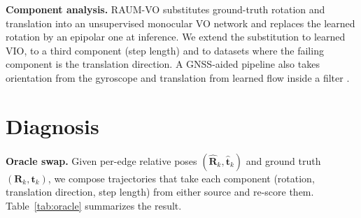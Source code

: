 \documentclass[letterpaper,journal]{IEEEtran}
\begin{document}
\textbf{Component analysis.} RAUM-VO \cite{Cimarelli2022} substitutes ground-truth rotation and translation into an unsupervised monocular VO network and replaces the learned rotation by an epipolar one at inference. We extend the substitution to learned VIO, to a third component (step length) and to datasets where the failing component is the translation direction. A GNSS-aided pipeline also takes orientation from the gyroscope and translation from learned flow inside a filter \cite{Kang2025}.

\section{Diagnosis}
\label{sec:diag}

\textbf{Oracle swap.} Given per-edge relative poses $(\hat{\mathbf{R}}_k,\hat{\mathbf{t}}_k)$ and ground truth $(\mathbf{R}_k,\mathbf{t}_k)$, we compose trajectories that take each component (rotation, translation direction, step length) from either source and re-score them. Table~\ref{tab:oracle} summarizes the result.

\begin{table}[t]
\caption{Oracle swaps. KITTI: our VIFT reproduction (released code, with-08 split, checkpoint selected on the test drives as in VIFT's code), $t_\mathrm{rel}$\,\% / $r_\mathrm{rel}$\,$^\circ$/100\,m, mean of 05/07/10. EuRoC: learned models, SE(3) ATE (m), MH\_05/V2\_02/V1\_01/V1\_02.}
\label{tab:oracle}
\centering\small
\setlength{\tabcolsep}{4pt}
\end{table}
\end{document}

